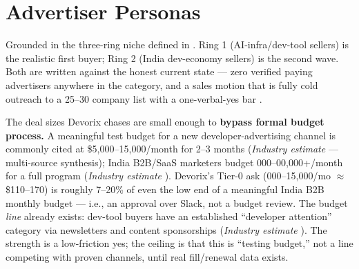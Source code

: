 \section{Advertiser Personas}
\label{sec:advertiser-personas}

Grounded in the three-ring niche defined in \cite{masterplan_2026}. Ring 1 (AI-infra/dev-tool sellers) is the realistic first buyer; Ring 2 (India dev-economy sellers) is the second wave. Both are written against the honest current state --- zero verified paying advertisers anywhere in the category, and a sales motion that is fully cold outreach to a 25--30 company list with a one-verbal-yes bar \cite{masterplan_2026}.

The deal sizes Devorix chases are small enough to \textbf{bypass formal budget process.} A meaningful test budget for a new developer-advertising channel is commonly cited at \$5{,}000--15{,}000/month for 2--3 months (\emph{Industry estimate} --- multi-source synthesis); India B2B/SaaS marketers budget 000--00{,}000+/month for a full program (\emph{Industry estimate} \cite{mediaant_2026,upgrowth_2026}). Devorix's Tier-0 ask (000--15{,}000/mo $\approx$ \$110--170) is roughly 7--20\% of even the low end of a meaningful India B2B monthly budget --- i.e., an approval over Slack, not a budget review. The budget \emph{line} already exists: dev-tool buyers have an established ``developer attention'' category via newsletters and content sponsorships (\emph{Industry estimate} \cite{growsurf_dailydev_2026}). The strength is a low-friction yes; the ceiling is that this is ``testing budget,'' not a line competing with proven channels, until real fill/renewal data exists.

